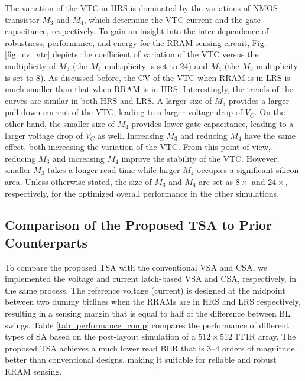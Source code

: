 The variation of the VTC in HRS is dominated by the variations of NMOS transistor $M_3$ and $M_4$, which determine the VTC current and the gate capacitance, respectively.
To gain an insight into the inter-dependence of robustness, performance, and energy for the RRAM sensing circuit, Fig. \ref{fig_cv_vtc} depicts the coefficient of variation of the VTC versus the multiplicity of $M_3$ (the $M_4$ multiplicity is set to 24) and $M_4$ (the $M_3$ multiplicity is set to 8). As discussed before, the CV of the VTC when RRAM is in LRS is much smaller than that when RRAM is in HRS. 
Interestingly, the trends of the curves are similar in both HRS and LRS. A larger size of $M_3$ provides a larger pull-down current of the VTC, leading to a larger voltage drop of $V_C$. On the other hand, the smaller size of $M_4$ provides lower gate capacitance, leading to a larger voltage drop of $V_C$ as well. Increasing $M_3$ and reducing $M_4$ have the same effect, both increasing the variation of the VTC. From this point of view, reducing $M_3$ and increasing $M_4$ improve the stability of the VTC. However, smaller $M_3$ takes a longer read time while larger $M_4$ occupies a significant silicon area.
Unless otherwise stated, the size of $M_3$ and $M_4$ are set as $8\times$ and $24\times$, respectively, for the optimized overall performance in the other simulations.

\subsection{Comparison of the Proposed TSA to Prior Counterparts}

To compare the proposed TSA with the conventional VSA and CSA, we implemented the voltage and current latch-based VSA and CSA, respectively, in the same process. The reference voltage (current) is designed at the midpoint between two dummy bitlines when the RRAMs are in HRS and LRS respectively, resulting in a sensing margin that is equal to half of the difference between BL swings. 
Table \ref{tab_performance_comp} compares the performance of different types of SA based on the post-layout simulation of a $512 \times 512$ 1T1R array. The proposed TSA achieves a much lower read BER that is 3--4 orders of magnitude better than conventional designs, making it suitable for reliable and robust RRAM sensing.


